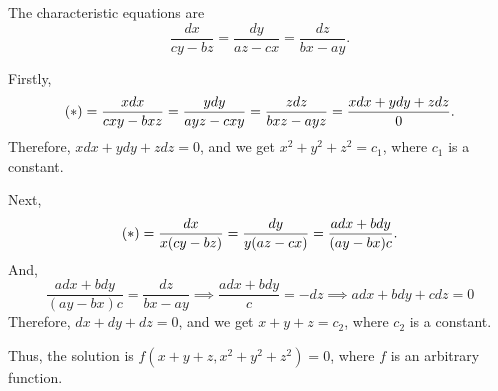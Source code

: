\documentclass[11pt]{penrose}
\begin{document}
\begin{problem}{2}
    
    The characteristic equations are
    \begin{equation*}
        \frac{dx}{cy-bz} = \frac{dy}{az-cx} = \frac{dz}{bx-ay}. \tag*{(\textasteriskcentered)}
    \end{equation*}

    Firstly,
    \begin{equation*}
        \text{(\textasteriskcentered)} = \frac{xdx}{cxy - bxz} = \frac{ydy}{ayz-cxy} = \frac{zdz}{bxz-ayz} = \frac{xdx+ydy+zdz}{0}.
    \end{equation*}
    Therefore, $xdx+ydy+zdz = 0$, and we get $x^2 + y^2 + z^2 = c_1$, where $c_1$ is a constant.

    Next,
    \begin{equation*}
        \text{(\textasteriskcentered)} = \frac{dx}{x(cy-bz)} = \frac{dy}{y(az-cx)} = \frac{adx+bdy}{(ay-bx)c}.
    \end{equation*}
    And,
    \begin{equation*}
        \frac{adx+bdy}{(ay-bx)c} = \frac{dz}{bx-ay}
        \implies \frac{adx+bdy}{c} = -dz
        \implies adx + bdy + cdz = 0
    \end{equation*}
    Therefore, $dx+dy+dz = 0$, and we get $x + y + z = c_2$, where $c_2$ is a constant.

    Thus, the solution is $f(x + y + z, x^2 + y^2 + z^2) = 0$, where $f$ is an arbitrary function.
\end{problem}
\end{document}
